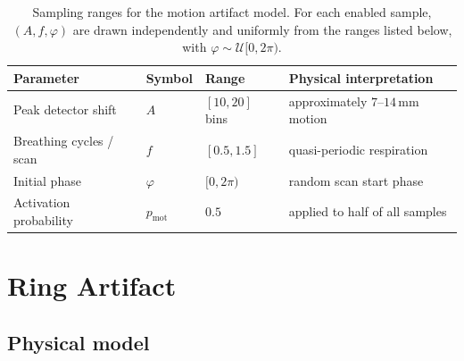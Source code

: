 \begin{table}[!htb]
    \centering
    \caption[Parameters of the motion artifact model.]{%
        Sampling ranges for the motion artifact model. For each enabled sample, $(A, f, \varphi)$ are drawn independently and uniformly from the ranges listed below, with $\varphi \sim \mathcal{U}[0,2\pi)$.}
    \label{tab:meth_motion_params}
    \begin{tabular}{llll}
        \toprule
        Parameter                & Symbol & Range & Physical interpretation \\
        \midrule
        Peak detector shift      & $A$            & $[10,20]$ bins & approximately $7$--$14\,\text{mm}$ motion \\
        Breathing cycles / scan  & $f$            & $[0.5,1.5]$    & quasi-periodic respiration \\
        Initial phase            & $\varphi$      & $[0,2\pi)$     & random scan start phase \\
        Activation probability   & $p_\text{mot}$ & $0.5$          & applied to half of all samples \\
        \bottomrule
    \end{tabular}
\end{table}

\section{Ring Artifact}
\label{sec:meth_ring}

\subsection{Physical model}

